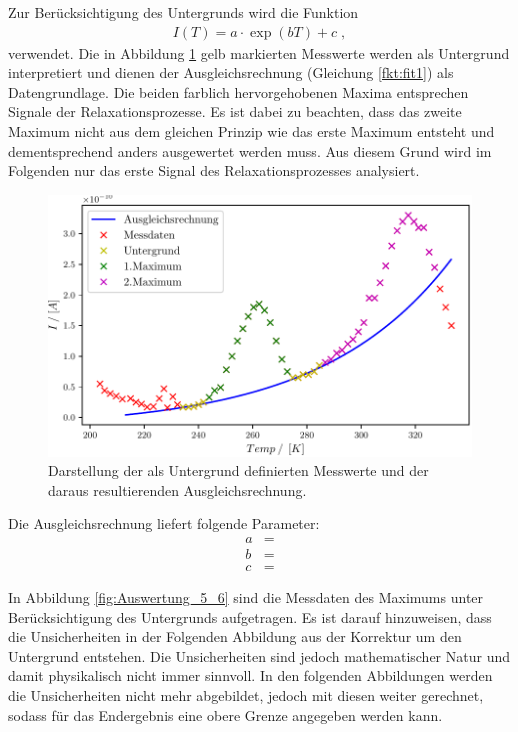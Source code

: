 Zur Berücksichtigung des Untergrunds wird die Funktion 
\begin{align}
	I(T)=a\cdot\exp{(bT)}+c \;,
	\label{fkt:fit1}
\end{align}
verwendet. 
Die in Abbildung \ref{fig:Auswertung_3_4} gelb markierten Messwerte werden als Untergrund interpretiert und dienen der Ausgleichsrechnung (Gleichung \eqref{fkt:fit1}) als Datengrundlage. Die beiden farblich hervorgehobenen Maxima entsprechen Signale der Relaxationsprozesse. Es ist dabei zu beachten, dass das zweite Maximum nicht aus dem gleichen Prinzip wie das erste Maximum entsteht und dementsprechend anders ausgewertet werden muss. Aus diesem Grund wird im Folgenden nur das erste Signal des Relaxationsprozesses analysiert. 


\begin{figure}[H]
  \centering
  \includegraphics[width=.75\textwidth]{build/1_Temp_current_background_peak.pdf}
  \caption{Darstellung der als Untergrund definierten Messwerte und der daraus resultierenden Ausgleichsrechnung.}
  \label{fig:Auswertung_3_4}
\end{figure}

Die Ausgleichsrechnung liefert folgende Parameter:
\begin{align}
  a &=  \\
  b &=  \\
  c &= 
\end{align}

In Abbildung \ref{fig:Auswertung_5_6} sind die Messdaten des Maximums unter Berücksichtigung des Untergrunds aufgetragen. Es ist darauf hinzuweisen, dass die Unsicherheiten in der Folgenden Abbildung aus der Korrektur um den Untergrund entstehen. Die Unsicherheiten sind jedoch mathematischer Natur und damit physikalisch nicht immer sinnvoll. In den folgenden Abbildungen werden die Unsicherheiten nicht mehr abgebildet, jedoch mit diesen weiter gerechnet, sodass für das Endergebnis eine obere Grenze angegeben werden kann.


